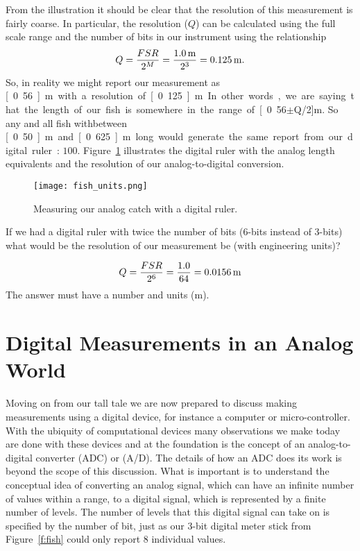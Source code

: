 From the illustration it should be clear that the resolution of this measurement is fairly coarse.  In particular, the resolution ($Q$) can be calculated using the full scale range and the number of bits in our instrument using the relationship
\begin{equation}
Q = \frac{FSR}{2^M} = \frac{\unit[1.0]{m}}{2^3} = \unit[0.125]{m}.
\end{equation}
So, in reality we might report our measurement as \unit[0.56]{m} with a resolution of \unit[0.125]{m}.  In other words, we are saying that the length of our fish is somewhere in the range of \unit[0.56$\pm$Q/2]{m}.  So any and all fish withbetween \unit[0.50]{m} and \unit[0.625]{m} long would generate the same report from our digital ruler: $100$. Figure~\ref{f:fish_units} illustrates the digital ruler with the analog length equivalents and the resolution of our analog-to-digital conversion.

\begin{figure}[hbt!]
\centering
\texttt{[image: fish\_units.png]}
\caption{Measuring our analog catch with a digital ruler.}
\label{f:fish_units}
\end{figure}

\begin{ex}
If we had a digital ruler with twice the number of bits (6-bits instead of 3-bits) what would be the resolution of our measurement be (with engineering units)?
\end{ex}

\ifsolutions
\begin{soln}
\[
Q = \frac{FSR}{2^6} = \frac{1.0}{64} = \unit[0.0156]{m}
\]
The answer must have a number and units (m).
\end{soln}
\fi


\section{Digital Measurements in an Analog World}
\label{s:dac}
Moving on from our tall tale we are now prepared to discuss making measurements using a digital device, for instance a computer or micro-controller.  With the ubiquity of computational devices many observations we make today are done with these devices and at the foundation is the concept of an \gls{analog-to-digital converter} (ADC) or (A/D).  The details of how an ADC does its work is beyond the scope of this discussion.  What is important is to understand the conceptual idea of converting an analog signal, which can have an infinite number of values within a range, to a digital signal, which is represented by a finite number of levels.  The number of levels that this digital signal can take on is specified by the number of bit, just as our 3-bit digital meter stick from Figure~\ref{f:fish} could only report 8 individual values.  

